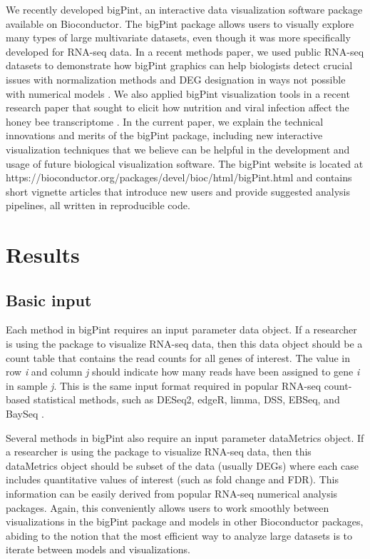 \documentclass{bmcart}
\begin{document}
We recently developed bigPint, an interactive data visualization software package available on Bioconductor. The bigPint package allows users to visually explore many types of large multivariate datasets, even though it was more specifically developed for RNA-seq data. In a recent methods paper, we used public RNA-seq datasets to demonstrate how bigPint graphics can help biologists detect crucial issues with normalization methods and DEG designation in ways not possible with numerical models \cite{rutter1}. We also applied bigPint visualization tools in a recent research paper that sought to elicit how nutrition and viral infection affect the honey bee transcriptome \cite{rutter2}. In the current paper, we explain the technical innovations and merits of the bigPint package, including new interactive visualization techniques that we believe can be helpful in the development and usage of future biological visualization software. The bigPint website is located at https://bioconductor.org/packages/devel/bioc/html/bigPint.html and contains short vignette articles that introduce new users and provide suggested analysis pipelines, all written in reproducible code.

\section*{Results}

\subsection*{Basic input}

Each method in bigPint requires an input parameter data object. If a researcher is using the package to visualize RNA-seq data, then this data object should be a count table that contains the read counts for all genes of interest. The value in row \textit{i} and column \textit{j} should indicate how many reads have been assigned to gene \textit{i} in sample \textit{j}. This is the same input format required in popular RNA-seq count-based statistical methods, such as DESeq2, edgeR, limma, DSS, EBSeq, and BaySeq \cite{??????}. 

Several methods in bigPint also require an input parameter dataMetrics object. If a researcher is using the package to visualize RNA-seq data, then this dataMetrics object should be subset of the data (usually DEGs) where each case includes quantitative values of interest (such as fold change and FDR). This information can be easily derived from popular RNA-seq numerical analysis packages. Again, this conveniently allows users to work smoothly between visualizations in the bigPint package and models in other Bioconductor packages, abiding to the notion that the most efficient way to analyze large datasets is to iterate between models and visualizations. 
\end{document}
